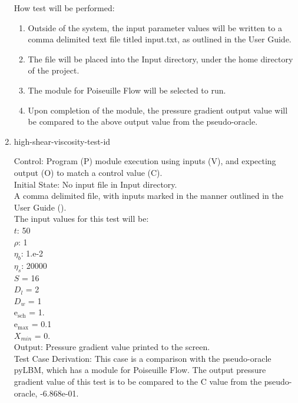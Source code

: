 \documentclass[12pt, titlepage]{article}
\newcounter{testcounter} %
\begin{document}
\begin{enumerate}
How test will be performed: 

\begin{enumerate}
\item Outside of the system, the input parameter values will be written to a comma delimited text file titled input.txt, as outlined in the User Guide.
\item The file will be placed into the Input directory, under the home directory of the project.
\item The module for Poiseuille Flow will be selected to run.
\item Upon completion of the module, the pressure gradient output value will be compared to the above output value from the pseudo-oracle.
\end{enumerate}	

\item{high-shear-viscosity-test-id\thetestcounter \\}

Control: Program (P) module execution using inputs (V), and expecting output (O)
to match a control value (C).\\
					
Initial State: No input file in Input directory.\\
					
A comma delimited file, with inputs marked in the manner outlined in the User
Guide (\citet{LBM_UserGuide_PM}).\\The input values for this test will be:\\
$t$: 50\\
$\rho$: 1\\
$\eta_b$: 1.e-2\\
$\eta_s$: 20000\\
$S$ = 16\\
$D_{l}$ = 2\\
$D_{w}$ = 1\\
$\mathrm{e_{sch}}$ = 1.\\
$\mathrm{e_{max}}$ = 0.1\\
$X_{min}$ = 0.\\
					
Output: Pressure gradient value printed to the screen. \\ 

Test Case Derivation: This case is a comparison with the pseudo-oracle pyLBM,
which has a module for Poiseuille Flow. The output pressure gradient value of
this test is to be compared to the C value from the pseudo-oracle,
-6.868e-01.\\
					

\end{enumerate}
\end{document}
